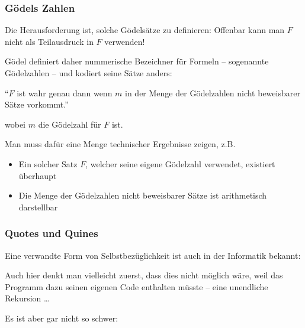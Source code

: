 \documentclass[aspectratio=1610,onlymath]{beamer}
\begin{document}
\begin{frame}\frametitle{Gödels Zahlen}

\smallskip

Die Herausforderung ist, solche Gödelsätze zu definieren:
Offenbar kann man $F$ nicht als Teilausdruck in $F$ verwenden!
\bigskip\pause

Gödel definiert daher nummerische Bezeichner für Formeln -- sogenannte Gödelzahlen -- und kodiert seine Sätze anders:
\begin{center}\alert{"`$F$ ist wahr genau dann wenn $m$ in der Menge der Gödelzahlen nicht beweisbarer Sätze vorkommt."'} \end{center}
wobei $m$ die Gödelzahl für $F$ ist.\medskip

Man muss dafür eine Menge technischer Ergebnisse zeigen, z.B.
\begin{itemize}
\item Ein solcher Satz $F$, welcher seine eigene Gödelzahl verwendet, existiert überhaupt
\item Die Menge der Gödelzahlen nicht beweisbarer Sätze ist arithmetisch darstellbar
\end{itemize}

\end{frame}


\begin{frame}\frametitle{Quotes und Quines}

Eine verwandte Form von Selbstbezüglichkeit ist auch in der Informatik bekannt:\medskip


Auch hier denkt man vielleicht zuerst, dass dies nicht möglich wäre, weil das Programm dazu seinen eigenen Code enthalten müsste -- eine unendliche Rekursion \ldots\medskip
\pause

Es ist aber gar nicht so schwer:
\bigskip
{}

\end{frame}

\end{document}
